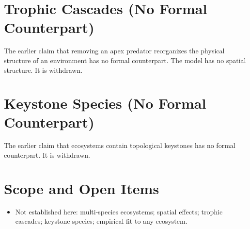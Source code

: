 \documentclass[11pt, a4paper]{article}
\begin{document}
\section{Trophic Cascades (No Formal Counterpart)}
The earlier claim that removing an apex predator reorganizes the physical structure of an environment has no formal counterpart. The model has no spatial structure. It is withdrawn.

\section{Keystone Species (No Formal Counterpart)}
The earlier claim that ecosystems contain topological keystones has no formal counterpart. It is withdrawn.

\section{Scope and Open Items}
\begin{itemize}
  \item Not established here: multi-species ecosystems; spatial effects; trophic cascades; keystone species; empirical fit to any ecosystem.
\end{itemize}
\end{document}
